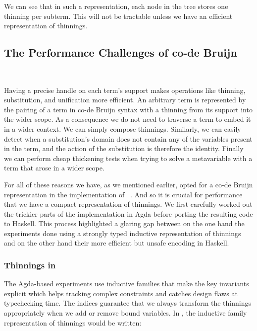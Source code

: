 
We can see that in such a representation, each node in the tree stores one
thinning per subterm. This will not be tractable unless we have an efficient
representation of thinnings.


\subsection{The Performance Challenges of co-de Bruijn}~\label{sec:thinningsintypos}

Having a precise handle on each term's support makes operations like thinning,
substitution, and unification more efficient.
%
An arbitrary term is represented by the pairing of a term in co-de Bruijn syntax
with a thinning from its support into the wider scope.
%
As a consequence we do not need to traverse a term to embed it in a wider context.
We can simply compose thinnings.
%
Similarly, we can easily detect when a substitution's domain does not contain any
of the variables present in the term, and the action of the substitution is therefore
the identity.
%
Finally we can perform cheap thickening tests when trying to solve a metavariable with
a term that arose in a wider scope.

For all of these reasons we have, as we mentioned earlier, opted for a co-de Bruijn
representation in the implementation of \typos~\cite{MANUAL:talk/types/Allais22}.
%
And so it is crucial for performance that we have a compact representation of thinnings.
%
We first carefully worked out the trickier parts of the implementation in Agda before
porting the resulting code to Haskell.
%
This process highlighted a glaring gap between on the one hand the experiments done
using a strongly typed inductive representation of thinnings and on the other hand
their more efficient but unsafe encoding in Haskell.

\subsubsection{Thinnings in \typos}

The Agda-based experiments use inductive families that make the key invariants
explicit which helps tracking complex constraints and catches design flaws at
typechecking time.
%
The indices guarantee that we always transform the thinnings appropriately when
we add or remove bound variables. In \idris{}, the inductive family representation
of thinnings would be written:

